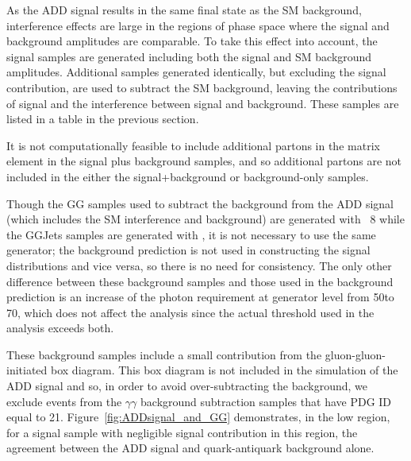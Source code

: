 As the ADD signal results in the same final state as the SM
background, interference effects are large in the regions of phase space where the signal and background amplitudes are comparable.
To take this effect into account, the signal samples are generated including both the signal and SM background amplitudes.
Additional samples generated identically, but excluding the signal contribution, are used to subtract the SM background, leaving the contributions of
signal and the interference between signal and background. These samples are listed in a table in the previous section.

It is not computationally feasible to include additional partons in
the matrix element in the signal plus background samples, and so
additional partons are not included in the either the 
signal+background or background-only samples.

Though the \textrm{GG} samples used to subtract the background from the ADD signal (which includes the SM interference and background) are generated with \PYTHIA~8 while the \textrm{GGJets}
samples are generated with \SHERPA, it is not necessary to use the same generator; the background prediction is not used in constructing the signal distributions and vice versa, so there is
no need for consistency. The only other difference between these background samples and those used in the background prediction is an increase of the photon \pt requirement at
generator level from 50\GeV to 70\GeV, which does not affect the
analysis since the actual \pt threshold used in the analysis exceeds both.

These background samples include a small contribution from the gluon-gluon-initiated box diagram.
This box diagram is not included in the simulation of the ADD signal and so, in order to avoid over-subtracting the background, we exclude events from the $\gamma\gamma$ background subtraction samples that have PDG ID equal to 21. Figure~\ref{fig:ADDsignal_and_GG} demonstrates, in the low \mgg region, for a signal sample with negligible signal contribution in this region, the agreement between the ADD signal and quark-antiquark background alone. 


